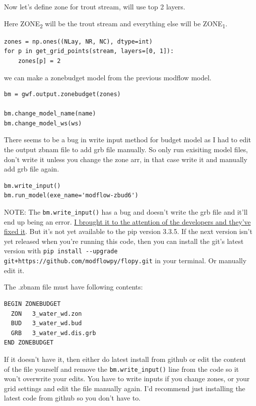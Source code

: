 \documentclass[titlepage,12pt]{unisubmission}
\begin{document}
Now let's define zone for trout stream, will use top 2 layers.

Here ZONE\textsubscript{2} will be the trout stream and everything else will be ZONE\textsubscript{1}.
\begin{verbatim}
zones = np.ones((NLay, NR, NC), dtype=int)
for p in get_grid_points(stream, layers=[0, 1]):
    zones[p] = 2
\end{verbatim}


we can make a zonebudget model from the previous modflow model.
\begin{verbatim}
bm = gwf.output.zonebudget(zones)

bm.change_model_name(name)
bm.change_model_ws(ws)
\end{verbatim}


There seems to be a bug in write input method for budget model as I had to edit the output zbnam file to add grb file manually. So only run exisiting model files, don't write it unless you change the zone arr, in that case write it and manually add grb file again.

\begin{verbatim}
bm.write_input()
bm.run_model(exe_name='modflow-zbud6')
\end{verbatim}

NOTE: The \texttt{bm.write\_input()} has a bug and doesn't write the grb file and it'll end up being an error. \href{https://github.com/modflowpy/flopy/issues/1395}{I brought it to the attention of the developers and they've fixed it}. But it's not yet available to the pip version 3.3.5. If the next version isn't yet released when you're running this code, then you can install the git's latest version with \texttt{pip install -{}-upgrade git+https://github.com/modflowpy/flopy.git} in your terminal. Or manually edit it.

The .zbnam file must have following contents:

\begin{verbatim}
BEGIN ZONEBUDGET
  ZON   3_water_wd.zon
  BUD   3_water_wd.bud
  GRB   3_water_wd.dis.grb
END ZONEBUDGET
\end{verbatim}

If it doesn't have it, then either do latest install from github or edit the content of the file yourself and remove the \texttt{bm.write\_input()} line from the code so it won't overwrite your edits. You have to write inputs if you change zones, or your grid settings and edit the file manually again.
I'd recommend just installing the latest code from github so you don't have to.
\end{document}
